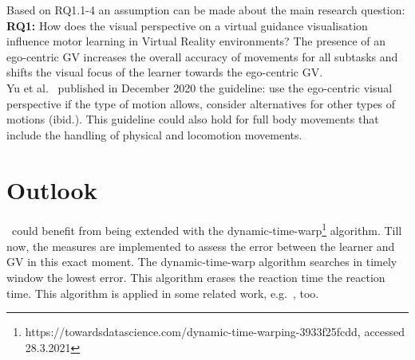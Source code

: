 Based on RQ1.1-4 an assumption can be made about the main research question:\\
\textbf{RQ1:} How does the visual perspective on a virtual guidance visualisation influence motor learning in Virtual Reality environments?
The presence of an ego-centric GV increases the overall accuracy of movements for all subtasks and shifts the visual focus of the learner towards the ego-centric GV.\\

Yu et al.~\cite{perspectivematters} published in December 2020 the guideline: use the ego-centric visual perspective if the type of motion allows, consider alternatives for other types of motions (ibid.). This guideline could also hold for full body movements that include the handling of physical and locomotion movements.

\section{Outlook}
\label{sec:outlook}
\exgo\ could benefit from being extended with the dynamic-time-warp\footnote{https://towardsdatascience.com/dynamic-time-warping-3933f25fcdd, accessed 28.3.2021} algorithm. Till now, the measures are implemented to assess the error between the learner and GV in this exact moment. The dynamic-time-warp algorithm searches in timely window the lowest error. This algorithm erases the reaction time the reaction time. This algorithm is applied in some related work, e.g.~\cite{thaichichua}, too.\\

